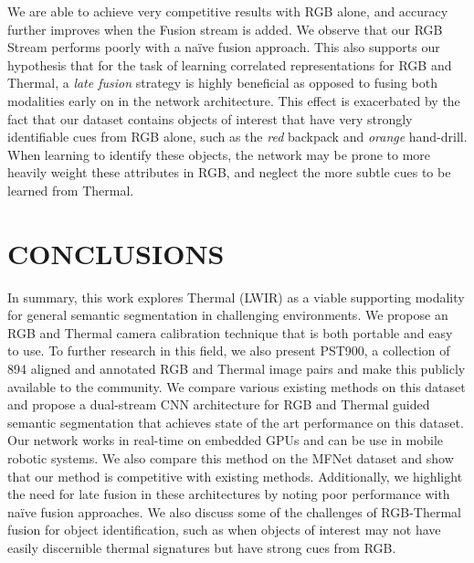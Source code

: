 \documentclass[letterpaper, 10 pt, conference]{ieeeconf}
\begin{document}
We are able to achieve very competitive results with RGB alone, and accuracy further improves when the Fusion stream is added. We observe that our RGB Stream performs poorly with a na\"ive fusion approach. This also supports our hypothesis that for the task of learning correlated representations for RGB and Thermal, a \textit{late fusion} strategy is highly beneficial as opposed to fusing both modalities early on in the network architecture. This effect is exacerbated by the fact that our dataset contains objects of interest that have very strongly identifiable cues from RGB alone, such as the \textit{red} backpack and \textit{orange} hand-drill. When learning to identify these objects, the network may be prone to more heavily weight these attributes in RGB, and neglect the more subtle cues to be learned from Thermal.    
\section{CONCLUSIONS}

In summary, this work explores Thermal (LWIR) as a viable supporting modality for general semantic segmentation in challenging environments. We propose an RGB and Thermal camera calibration technique that is both portable and easy to use. To further research in this field, we also present PST900, a collection of 894 aligned and annotated RGB and Thermal image pairs and make this publicly available to the community. We compare various existing methods on this dataset and propose a dual-stream CNN architecture for RGB and Thermal guided semantic segmentation that achieves state of the art performance on this dataset. Our network works in real-time on embedded GPUs and can be use in mobile robotic systems. We also compare this method on the MFNet dataset and show that our method is competitive with existing methods. Additionally, we highlight the need for late fusion in these architectures by noting poor performance with na\"ive fusion approaches. We also discuss some of the challenges of RGB-Thermal fusion for object identification, such as when objects of interest may not have easily discernible thermal signatures but have strong cues from RGB.  
\balance 























\end{document}
